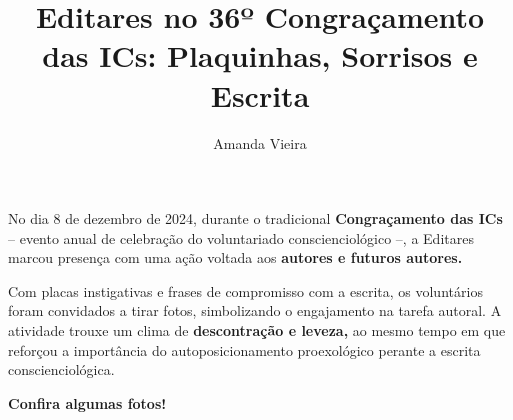 \documentclass{gescons}
\author{Amanda Vieira}
\title{Editares no 36º Congraçamento das ICs: Plaquinhas, Sorrisos e Escrita}
\begin{document}
    \makeentrevistatitle


    






No dia 8 de dezembro de 2024, durante o tradicional \textbf{Congraçamento das ICs} -- evento anual de celebração do voluntariado conscienciológico --, a Editares marcou presença com uma ação voltada aos \textbf{autores e futuros autores.}

Com placas instigativas e frases de compromisso com a escrita, os voluntários foram convidados a tirar fotos, simbolizando o engajamento na tarefa autoral. A atividade trouxe um clima de \textbf{descontração e leveza,} ao mesmo tempo em que reforçou a importância do autoposicionamento proexológico perante a escrita conscienciológica.

\textbf{Confira algumas fotos!}
\end{document}
